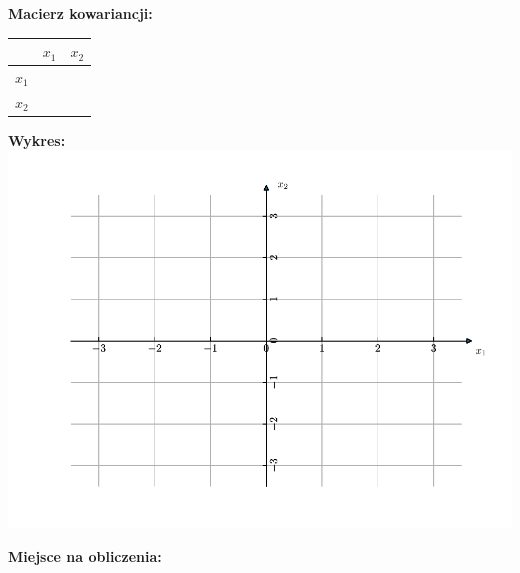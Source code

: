 \documentclass[a4paper,11pt]{article}
\newcommand{\myHeaderCellColor}{\cellcolor{black!10}}
\newcommand{\emptybox}[2][\textwidth]{%
	\begingroup
	\setlength{\fboxsep}{-\fboxrule}%
	\noindent\framebox[#1]{\rule{0pt}{#2}}%
	\endgroup
}
\newcommand{\myEmptySpace}{\hspace{0.8cm}}
\begin{document}
%
\begin{minipage}[t]{0.3\textwidth}
\noindent\textbf{Macierz kowariancji:}\medskip\\
\begin{tabular}{l|r|r|}
\hhline{|~|-|-|}
& $x_1$\myHeaderCellColor & $x_2$\myHeaderCellColor\\\hline
\multicolumn{1}{|l|}{$x_1$\myHeaderCellColor} &\myEmptySpace &\myEmptySpace \\\hline
\multicolumn{1}{|l|}{$x_2$\myHeaderCellColor} &\myEmptySpace &\myEmptySpace \\\hline
\end{tabular}
\end{minipage}
%
\begin{minipage}[t]{0.45\textwidth}
	\noindent\textbf{Wykres:}\\\vspace{-0.1cm}
	\hspace{-0.85cm}\includegraphics[width=1.0\textwidth]{img/chart_pca_clear_x.pdf}
\end{minipage}



\noindent\textbf{Miejsce na obliczenia:}\medskip\\
\emptybox[\linewidth]{6cm}
\end{document}
